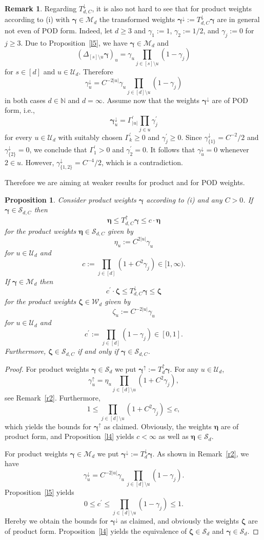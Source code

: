 \documentclass{article}
\newcommand{\N}  {{\mathbb N}}
\newcommand{\bg}{{\boldsymbol{\gamma}}}
\newcommand{\be}{{\boldsymbol{\eta}}}
\newcommand{\bz}{{\boldsymbol{\zeta}}}
\newcommand{\U}  {\mathcal{U}}
\newcommand{\W}  {\mathcal{W}}
\newcommand{\M}  {\mathcal{M}}
\newcommand{\SSS}{\mathcal{S}}
\newcommand{\lo}{\downarrow}
\newcommand{\up}{\uparrow}
\theoremstyle{plain}
\newtheorem{prop}{Proposition}
\theoremstyle{definition}
\newtheorem{rem}{Remark}
\begin{document}
\begin{rem}
Regarding $T^\lo_{d,C}$, it is also not hard to see that
for product weights according to (i) with
$\bg \in \M_d$ the transformed weights 
$\bg^\lo := T^\lo_{d,C} \bg$
are in general not even of POD form.
Indeed, 
let $d \geq 3$ and $\gamma_1 := 1$, $\gamma_2 := 1/2$, and
$\gamma_j := 0$ for $j \geq 3$.
Due to Proposition~\ref{l5}, we have $\bg \in \M_d$ and
\[
\left(\Delta_{[s] \setminus u} \bg\right)_u = 
\gamma_u \prod_{j\in [s] \setminus u} (1-\gamma_j) 
\]
for $s \in [d]$ and $u \in \U_d$. Therefore
\[
\gamma_u^{\lo} = 
C^{- 2|u|} \gamma_u 
\prod_{j\in [d]\setminus u} (1-\gamma_j)
\]
in both cases $d \in \N$ and $d = \infty$.
Assume now that the weights $\bg^\lo$ are of POD form, i.e.,
\[
\bg^\lo_u = \Gamma^\prime_{|u|} \prod_{j \in u} \gamma^\prime_j 
\]
for every $u \in \U_d$ with suitably chosen $\Gamma^\prime_k \geq
0$ and $\gamma_j^\prime \geq 0$.
Since $\gamma^\lo_{\{1\}} = C^{-2} /2$ 
and $\gamma^\lo_{\{2\}} = 0$, we conclude that
$\Gamma^\prime_1 > 0$ and $\gamma^\prime_2 = 0$.
It follows that $\gamma^\lo_u = 0$ whenever $2 \in u$.
However, $\gamma^\lo_{\{1,2\}} = C^{-4} /2$,
which is a contradiction.
\end{rem}

Therefore we are aiming at weaker results for product and for POD
weights.

\begin{prop}\label{l6}
Consider product weights $\bg$ according to (i) and any $C>0$.
If $\bg \in \SSS_{d,C}$ then 
\[
\be \leq T^\up_{d,C} \bg \leq c \cdot \be
\]
for the product weights $\be \in \SSS_{d,C}$ given by
\[
\eta_u := C^{2|u|} \gamma_u
\]
for $u\in\U_d$
and
\[
c := \prod_{j \in [d]} (1+C^2 \gamma_j) \in {[1,\infty)}.
\]
If $\bg \in \M_d$ then 
\[
c^\prime \cdot \bz \leq T^\lo_{d,C} \bg \leq \bz
\]
for the product weights $\bz \in \W_d$ given by
\[
\zeta_u := C^{-2|u|} \gamma_u
\]
for $u\in\U_d$ and
\[
c^\prime := \prod_{j \in [d]} (1-\gamma_j) \in [0,1].
\]
Furthermore, $\bz \in \SSS_{d,C}$ if and only if $\bg \in
\SSS_{d,C}$.
\end{prop}


\begin{proof}
For product weights $\bg \in \SSS_d$ we put 
$\bg^{\up} := T^\up_d \bg$. 
For any $u\in\U_d$,
\[
\gamma_u^{\up} = 
\eta_u \prod_{j \in [d] \setminus u} (1+C^2 \gamma_j),
\]
see Remark~\ref{r2}.
Furthermore,
\[
1 \leq \prod_{j \in [d] \setminus u} (1+C^2 \gamma_j) \leq c,
\]
which yields the bounds for $\bg^\up$ as claimed.
Obviously, the weights $\be$ are of product form,
and Proposition~\ref{l4} yields $c < \infty$ as well as $\be \in \SSS_d$.

For product weights $\bg \in \M_d$ we put $\bg^{\lo} := T^\lo_d \bg$. 
As shown in Remark~\ref{r2}, we have 
\[
 \gamma^\lo_u = C^{-2|u|}  \gamma_u \, 
\prod_{j\in [d]\setminus u} (1-\gamma_j).
\]
Proposition~\ref{l5} yields
\[
0 \leq c^\prime 
\leq \prod_{j\in [d]\setminus u} (1-\gamma_j) \leq 1.
\]
Hereby we obtain the bounds for $\bg^\lo$ as claimed, and obviously
the weights $\bz$ are of product form.
Proposition~\ref{l4} yields the equivalence of $\bz \in \SSS_d$
and $\bg \in \SSS_d$.
\end{proof}
\end{document}
